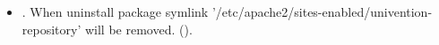 \begin{itemize}
\item {}. When uninstall package symlink
'/etc/apache2/sites-enabled/univention-repository' will be removed.
().

\end{itemize}

